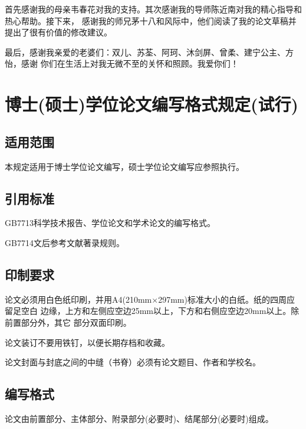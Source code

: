 \documentclass[master]{njuthesis}
\begin{document}
\begin{acknowledgement}
  首先感谢我的母亲韦春花对我的支持。其次感谢我的导师陈近南对我的精心指导和热心帮助。接下来，
  感谢我的师兄茅十八和风际中，他们阅读了我的论文草稿并提出了很有价值的修改建议。

  最后，感谢我亲爱的老婆们：双儿、苏荃、阿珂、沐剑屏、曾柔、建宁公主、方怡，感谢
  你们在生活上对我无微不至的关怀和照顾。我爱你们！
\end{acknowledgement}

\appendix

\chapter{博士(硕士)学位论文编写格式规定(试行)}

\section{适用范围}

本规定适用于博士学位论文编写，硕士学位论文编写应参照执行。

\section{引用标准}

GB7713科学技术报告、学位论文和学术论文的编写格式。

GB7714文后参考文献著录规则。

\section{印制要求}

论文必须用白色纸印刷，并用A4(210mm×297mm)标准大小的白纸。纸的四周应留足空白
边缘，上方和左侧应空边25mm以上，下方和右侧应空边20mm以上。除前置部分外，其它
部分双面印刷。

论文装订不要用铁钉，以便长期存档和收藏。

论文封面与封底之间的中缝（书脊）必须有论文题目、作者和学校名。

\section{编写格式}

论文由前置部分、主体部分、附录部分(必要时)、结尾部分(必要时)组成。
\end{document}
